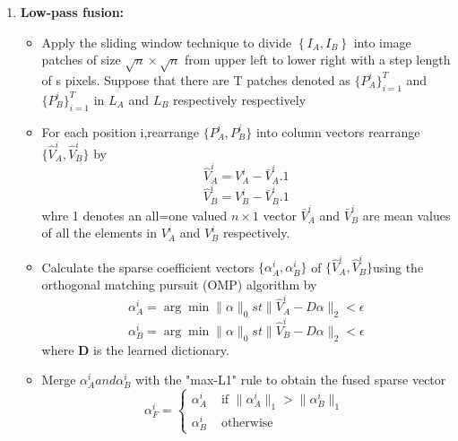 \begin{enumerate}
	\item  \textbf{Low-pass fusion:} 	    
   \begin{itemize}
     \item Apply the sliding window technique to divide \( \left\{ {I}_{A},{I}_{B}\right\}  \)  into image patches of size \(\sqrt{n}\times\sqrt{n}\) from upper left to lower
right with a step length of s pixels. Suppose that there are
T patches denoted as \( \{{P}_{A}^{i}\}_{i=1}^{T}   \)
and  \( \{{P}_{B}^{i}\}_{i=1}^{T} \) in \({L}_{A}\) and \({L}_{B}\) respectively
respectively
     \item For each position i,rearrange \(\{P_{A}^{i},P_{B}^{i} \} \) into column vectors rearrange \(\{ \hat{V}_{A}^{i},\hat{V}_{B}^{i} \} \) by \begin{equation}
     \hat{V}_{A}^{i}=V_{A}^{i}-\bar{V}_{A}^{i}.1
     \end{equation}
     \begin{equation}
     \hat{V}_{B}^{i}=V_{B}^{i}-\bar{V}_{B}^{i}.1
     \end{equation}
     whre 1 denotes an all=one valued \(n \times 1 \) vector \(\bar{V}_{A}^{i}\) and \(\bar{V}_{B}^{i}\) are mean values of all the elements in \({V}_{A}^{i}\) and \({V}_{B}^{i}\) respectively.
     \item Calculate the sparse coefficient vectors \( \{\alpha_{A}^{i},\alpha_{B}^{i} \} \) of \(\{ \hat{V}_{A}^{i},\hat{V}_{B}^{i} \}\)using the orthogonal matching pursuit (OMP) algorithm \cite{24} by
     \begin{equation}
    \alpha _{A}^{i}=\arg \min \parallel \alpha \parallel _{0}   st \parallel \hat{V}_{A}^{i}-D\alpha \parallel_{2} < \epsilon     
\end{equation}      
\begin{equation} \label{eq:6}
\alpha _{B}^{i}=\arg \min \parallel \alpha \parallel _{0}   st \parallel \hat{V}_{B}^{i}-D\alpha \parallel_{2} < \epsilon
\end{equation}
where \textbf{D} is the learned dictionary.
\item Merge \( \alpha_{A}^{i} and \alpha_{B}^{i} \) with the "max-L1" rule to obtain the fused sparse vector
\begin{equation}
\alpha_{F}^{i}=
\begin{cases}
\alpha_{A}^{i} & \text{ if } \parallel \alpha_{A}^{i} \parallel_1 > \parallel \alpha_{B}^{i} \parallel_1\\ 
\alpha_{B}^{i} & \text{ otherwise } 
\end{cases}
\end{equation}

\end{itemize}
\end{enumerate}
